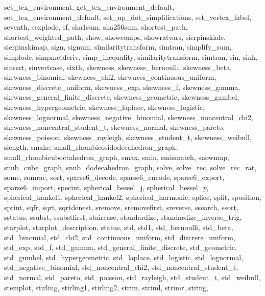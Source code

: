 {{    set_tex_environment,
    get_tex_environment_default,
    set_tex_environment_default,
    set_up_dot_simplifications,
    set_vertex_label,
    seventh,
    sexplode,
    sf,
    sha1sum,
    sha256sum,
    shortest_path,
    shortest_weighted_path,
    show,
    showcomps,
    showratvars,
    sierpinskiale,
    sierpinskimap,
    sign,
    signum,
    similaritytransform,
    simtran,
    simplify_sum,
    simplode,
    simpmetderiv,
    simp_inequality,
    similaritytransform,
    simtran,
    sin,
    sinh,
    sinsert,
    sinvertcase,
    sixth,
    skewness,
    skewness_bernoulli,
    skewness_beta,
    skewness_binomial,
    skewness_chi2,
    skewness_continuous_uniform,
    skewness_discrete_uniform,
    skewness_exp,
    skewness_f,
    skewness_gamma,
    skewness_general_finite_discrete,
    skewness_geometric,
    skewness_gumbel,
    skewness_hypergeometric,
    skewness_laplace,
    skewness_logistic,
    skewness_lognormal,
    skewness_negative_binomial,
    skewness_noncentral_chi2,
    skewness_noncentral_student_t,
    skewness_normal,
    skewness_pareto,
    skewness_poisson,
    skewness_rayleigh,
    skewness_student_t,
    skewness_weibull,
    slength,
    smake,
    small_rhombicosidodecahedron_graph,
    small_rhombicuboctahedron_graph,
    smax,
    smin,
    smismatch,
    snowmap,
    snub_cube_graph,
    snub_dodecahedron_graph,
    solve,
    solve_rec,
    solve_rec_rat,
    some,
    somrac,
    sort,
    sparse6_decode,
    sparse6_encode,
    sparse6_export,
    sparse6_import,
    specint,
    spherical_bessel_j,
    spherical_bessel_y,
    spherical_hankel1,
    spherical_hankel2,
    spherical_harmonic,
    splice,
    split,
    sposition,
    sprint,
    sqfr,
    sqrt,
    sqrtdenest,
    sremove,
    sremovefirst,
    sreverse,
    ssearch,
    ssort,
    sstatus,
    ssubst,
    ssubstfirst,
    staircase,
    standardize,
    standardize_inverse_trig,
    starplot,
    starplot_description,
    status,
    std,
    std1,
    std_bernoulli,
    std_beta,
    std_binomial,
    std_chi2,
    std_continuous_uniform,
    std_discrete_uniform,
    std_exp,
    std_f,
    std_gamma,
    std_general_finite_discrete,
    std_geometric,
    std_gumbel,
    std_hypergeometric,
    std_laplace,
    std_logistic,
    std_lognormal,
    std_negative_binomial,
    std_noncentral_chi2,
    std_noncentral_student_t,
    std_normal,
    std_pareto,
    std_poisson,
    std_rayleigh,
    std_student_t,
    std_weibull,
    stemplot,
    stirling,
    stirling1,
    stirling2,
    strim,
    striml,
    strimr,
    string,
}}
